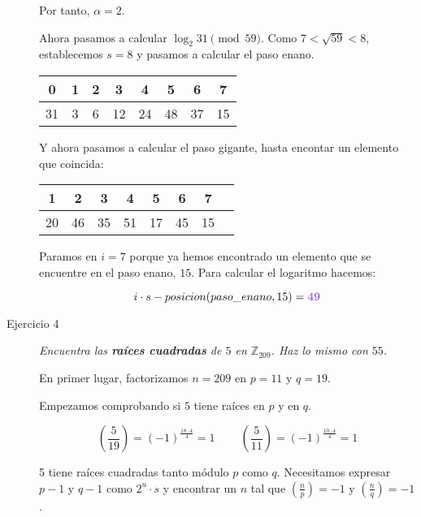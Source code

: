 \documentclass[10pt,spanish]{article}
\begin{document}
\begin{description}
    Por tanto, $\alpha = 2$.

    Ahora pasamos a calcular $\log_2 31 \pmod{59}$. Como $7 < \sqrt{59} < 8$, establecemos $s = 8$ y pasamos a calcular el paso enano.

    \begin{center}
    \begin{tabular}{c | c | c | c | c | c | c | c}
    0 & 1 & 2 & 3 & 4 & 5 & 6 & 7 \\
    \hline 
    31 & 3 & 6 & 12 & 24 & 48 & 37 & 15
    \end{tabular}
    \end{center}

    Y ahora pasamos a calcular el paso gigante, hasta encontar un elemento que coincida:

    \begin{center}
    \begin{tabular}{c | c | c | c | c | c | c | c}
    1 & 2 & 3 & 4 & 5 & 6 & 7 \\
    \hline 
    20 & 46 & 35 & 51 & 17 & 45 & 15 
    \end{tabular}
    \end{center}

    Paramos en $i=7$ porque ya hemos encontrado un elemento que se encuentre en el paso enano, $15$. Para calcular el logaritmo hacemos:

    \begin{displaymath}
        i \cdot s - posicion(paso\_enano, 15) = \mathbf{\textcolor{morado}{49}}
    \end{displaymath}

    \item[Ejercicio 4] \textit{Encuentra las \textcolor{morado}{\textbf{raíces cuadradas}} de $5$ en $\mathbb{Z}_{209}$. Haz lo mismo con $55$.}

    En primer lugar, factorizamos $n = 209$ en $p = 11$ y $q = 19$.

    Empezamos comprobando si $5$ tiene raíces en $p$ y en $q$.

    \begin{displaymath}
        \left(\frac{5}{19} \right) = (-1)^\frac{18 \cdot 4}{4} = 1 \qquad\ \left(\frac{5}{11} \right) = (-1)^\frac{10 \cdot 4}{4} = 1
    \end{displaymath}

    5 tiene raíces cuadradas tanto módulo $p$ como $q$. Necesitamos expresar $p-1$ y $q-1$ como $2^u \cdot s$  y encontrar un $n$ tal que $\left(\frac{n}{p} \right) = -1$ y $\left(\frac{n}{q} \right) = -1$.


\end{description}
\end{document}
